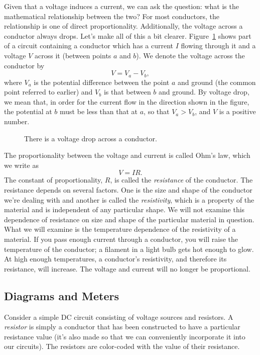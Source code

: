 Given that a voltage induces a current, we can ask the question: what is the 
mathematical relationship between the two?  For most conductors, the 
relationship is one of direct proportionality.  Additionally, the voltage 
across a conductor always drops. Let's make all of this a bit clearer. 
Figure~\ref{fig:DC:voltdrop} shows part of a circuit containing a conductor 
which has a current $I$ flowing through it and a voltage $V$ across it 
(between points $a$ and $b$).  
We denote the voltage across the conductor by 
$$ V = V_a - V_b, $$
where $V_a$ is the potential difference between the point $a$ and ground (the 
common point referred to earlier) and $V_b$ is that between $b$ and ground.
By voltage drop, we mean that, in order for the current flow in the direction 
shown in the figure, the potential at $b$ must be less than that at $a$, so 
that $V_a>V_b$, and $V$ is a positive number.
\begin{figure}
\centerline{\epsfxsize=5cm }
\caption{There is a voltage drop across a conductor.}
\label{fig:DC:voltdrop}
\end{figure}

The proportionality between the voltage and current is called Ohm's law, 
which we write as 
$$V=IR. $$
The constant of proportionality, $R$, is called the {\it resistance} of the 
conductor. The resistance depends on several factors. One is the size and 
shape of the conductor we're dealing with and another is called the 
{\it resistivity}, which is a property of the material and is independent of 
any particular shape. We will not examine this dependence of resistance on 
size and shape of the particular material in question. What we will examine is 
the temperature dependence of the resistivity of a material. If you pass enough
current through a conductor, you will raise the temperature of the conductor; 
a filament in a light bulb gets hot enough to glow.  At high enough 
temperatures, a conductor's resistivity, and therefore its resistance, will 
increase.  The voltage and current will no longer be proportional.  

\subsection{Diagrams and Meters}

Consider a simple DC circuit consisting of voltage sources and resistors.  A 
{\it resistor} is simply a conductor that has been constructed to have a 
particular resistance value (it's also made so that we can conveniently 
incorporate it into our circuits). The resistors are color-coded with the value
of their resistance. 

